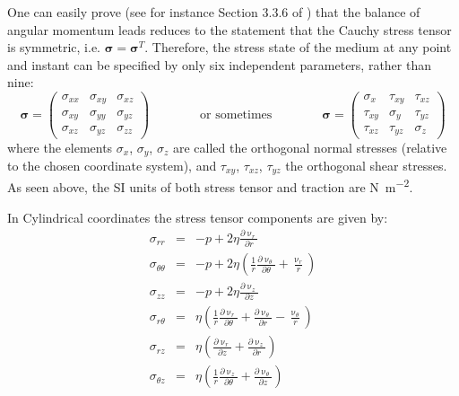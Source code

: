 One can easily prove (see for instance Section 3.3.6 of \cite{grbl09}) that the balance 
of angular momentum leads reduces to the statement that the Cauchy stress tensor 
is symmetric, i.e. ${\bm \sigma}={\bm \sigma}^T$.
Therefore, the stress state of the medium at any point and instant can be specified by only six independent parameters, rather than nine:
\begin{equation}
{\bm \sigma}=
\left(
\begin{array}{ccc}
\sigma_{xx} & \sigma_{xy} & \sigma_{xz} \\
\sigma_{xy} & \sigma_{yy} & \sigma_{yz} \\
\sigma_{xz} & \sigma_{yz} & \sigma_{zz} 
\end{array}
\right)
\qquad\qquad
\text{or sometimes}
\qquad\qquad
{\bm \sigma}=
\left(
\begin{array}{ccc}
\sigma_{x}  & \tau_{xy}  & \tau_{xz} \\
\tau_{xy}   & \sigma_{y} & \tau_{yz} \\
\tau_{xz}   & \tau_{yz}  & \sigma_{z} 
\end{array}
\right)
\end{equation}
where the elements $\sigma _{x}$, $\sigma _{y}$, $\sigma _{z}$ are called the orthogonal 
normal stresses (relative to the chosen coordinate system), and $\tau _{xy}$, $\tau _{xz}$,
$\tau _{yz}$ the orthogonal shear stresses.
As seen above, the SI units of both stress tensor and traction are \si{\newton\per\square\metre}.

In Cylindrical coordinates the stress tensor components are given by:
\begin{eqnarray}
\sigma_{rr} &=& -p + 2 \eta \frac{\partial \upnu_r}{\partial r}      \\
\sigma_{\theta\theta} &=& 
 -p + 2\eta \left( \frac{1}{r} \frac{\partial \upnu_\theta}{\partial\theta} +\frac{\upnu_r}{r} \right)    \\
\sigma_{zz} &=& -p + 2 \eta \frac{\partial \upnu_z}{\partial z}      \\
\sigma_{r\theta} &=& \eta \left( \frac{1}{r} \frac{\partial \upnu_r}{\partial \theta} 
+ \frac{\partial \upnu_\theta}{\partial r} - \frac{\upnu_\theta}{r} \right)  \\
\sigma_{rz} &=& \eta \left( \frac{\partial \upnu_r}{\partial z}  + \frac{\partial \upnu_z}{\partial r}\right) \\
\sigma_{\theta z} &=&  \eta \left(  \frac{1}{r} \frac{\partial \upnu_z}{\partial \theta}
+\frac{\partial \upnu_\theta}{\partial z}     \right) 
\end{eqnarray}

